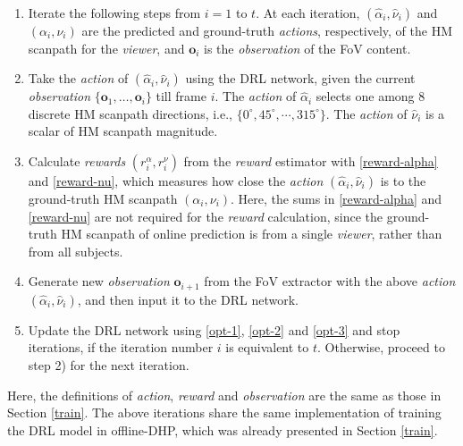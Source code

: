 \documentclass[10pt,journal,compsoc]{IEEEtran}
\begin{document}
%
\begin{enumerate}
  \item Iterate the following steps from $i=1$ to $t$. At each iteration, $(\hat{\alpha}_i,\hat{\nu}_i)$ and $(\alpha_i,\nu_i)$ are the predicted and ground-truth \textit{actions}, respectively, of the HM scanpath for the \textit{viewer}, and $\mathbf{o}_i$ is the \textit{observation} of the FoV content.
  \item Take the \textit{action} of $(\hat{\alpha}_i,\hat{\nu}_i)$ using the DRL network, given the current \textit{observation} $\{\mathbf{o}_1, \ldots, \mathbf{o}_i\}$ till frame $i$. The \textit{action} of $\hat{\alpha}_i$ selects one among 8 discrete HM scanpath directions, i.e., $\{ 0^{\circ}, 45^{\circ}, \cdots, 315^{\circ} \}$. The \textit{action} of $\hat{\nu}_i$ is a scalar of HM scanpath magnitude.
  \item Calculate \textit{rewards} $(r^{\alpha}_{i}, r^{\nu}_{i})$ from the \textit{reward} estimator with \eqref{reward-alpha} and \eqref{reward-nu}, which measures how close the \textit{action} $(\hat{\alpha}_i,\hat{\nu}_i)$ is to the ground-truth HM scanpath $(\alpha_i,\nu_i)$. Here, the sums in \eqref{reward-alpha} and \eqref{reward-nu}  are not required for the \textit{reward} calculation, since the ground-truth HM scanpath of online prediction is from a single \textit{viewer}, rather than from all subjects.
  \item Generate new \textit{observation} ${\mathbf{o}_{i+1}}$ from the FoV extractor with the above \textit{action} $(\hat{\alpha}_i,\hat{\nu}_i)$, and then input it to the DRL network.
  \item Update the DRL network using \eqref{opt-1}, \eqref{opt-2} and \eqref{opt-3} and stop iterations, if the iteration number $i$ is equivalent to $t$. Otherwise, proceed to step 2) for the next iteration.
\end{enumerate}
Here,  the definitions of \textit{action}, \textit{reward} and \textit{observation} are the same as those in Section \ref{train}.
The above iterations share the same implementation of training the DRL model in offline-DHP, which was already presented in Section \ref{train}.
\end{document}
